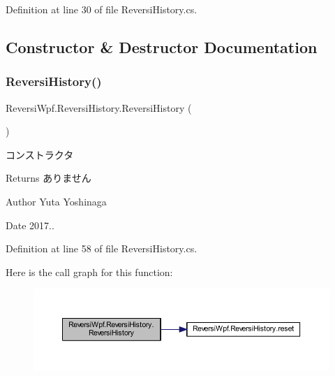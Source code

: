 Definition at line 30 of file Reversi\+History.\+cs.



\subsection{Constructor \& Destructor Documentation}
\mbox{\label{class_reversi_wpf_1_1_reversi_history_a25e64abaf19f7265921c21940c875d31}} 
\subsubsection{\texorpdfstring{Reversi\+History()}{ReversiHistory()}}
{\footnotesize\ttfamily Reversi\+Wpf.\+Reversi\+History.\+Reversi\+History (\begin{DoxyParamCaption}{ }\end{DoxyParamCaption})}



コンストラクタ 

\begin{DoxyReturn}{Returns}
ありません 
\end{DoxyReturn}
\begin{DoxyAuthor}{Author}
Yuta Yoshinaga 
\end{DoxyAuthor}
\begin{DoxyDate}{Date}
2017.. 
\end{DoxyDate}


Definition at line 58 of file Reversi\+History.\+cs.

Here is the call graph for this function\+:\nopagebreak
\begin{figure}[H]
\begin{center}
\leavevmode
\includegraphics[width=350pt]{class_reversi_wpf_1_1_reversi_history_a25e64abaf19f7265921c21940c875d31_cgraph}
\end{center}
\end{figure}


